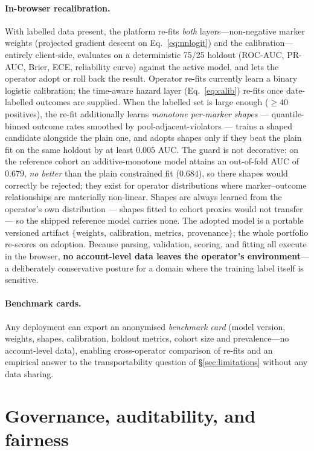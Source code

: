 \documentclass[11pt]{article}
\begin{document}
\paragraph{In-browser recalibration.} With labelled data present, the platform re-fits
\emph{both} layers---non-negative marker weights (projected gradient descent on
Eq.~\ref{eq:nnlogit}) and the calibration---entirely client-side,
evaluates on a deterministic 75/25 holdout (ROC-AUC, PR-AUC, Brier, ECE, reliability
curve) against the active model, and lets the operator adopt or roll back the result. Operator re-fits currently
learn a binary logistic calibration; the time-aware hazard layer
(Eq.~\ref{eq:calib}) re-fits once date-labelled outcomes are supplied.
When the labelled set is large enough ($\geq 40$ positives), the re-fit additionally
learns \emph{monotone per-marker shapes} --- quantile-binned outcome rates smoothed by
pool-adjacent-violators --- trains a shaped candidate alongside the plain one, and
adopts shapes only if they beat the plain fit on the same holdout by at least $0.005$
AUC. The guard is not decorative: on the reference cohort an additive-monotone model
attains an out-of-fold AUC of $0.679$, \emph{no better} than the plain constrained fit
($0.684$), so there shapes would correctly be rejected; they exist for operator
distributions where marker--outcome relationships are materially non-linear. Shapes
are always learned from the operator's own distribution --- shapes fitted to cohort
proxies would not transfer --- so the shipped reference model carries none.
The adopted model is a portable versioned artifact
$\{\text{weights},\ \text{calibration},\ \text{metrics},\ \text{provenance}\}$; the
whole portfolio re-scores on adoption. Because parsing, validation, scoring, and
fitting all execute in the browser, \textbf{no account-level data leaves the operator's
environment}---a deliberately conservative posture for a domain where the training
label itself is sensitive.

\paragraph{Benchmark cards.} Any deployment can export an anonymised
\emph{benchmark card} (model version, weights, shapes, calibration, holdout metrics,
cohort size and prevalence---no account-level data), enabling cross-operator
comparison of re-fits and an empirical answer to the transportability question of
\S\ref{sec:limitations} without any data sharing.

\section{Governance, auditability, and fairness}\label{sec:governance}
\end{document}
